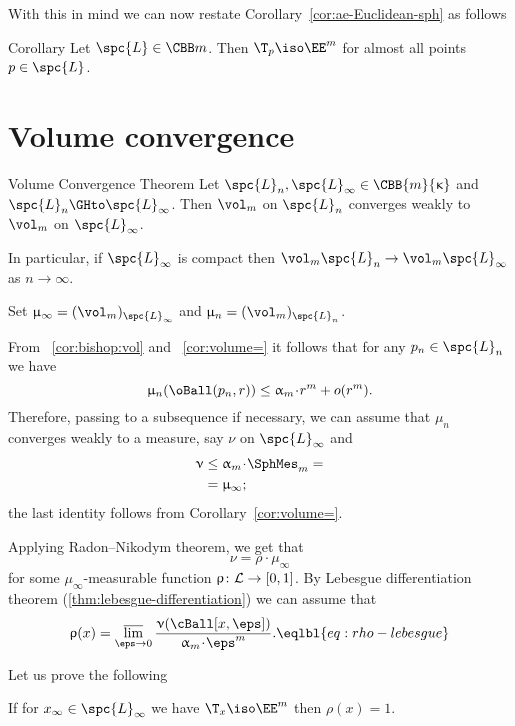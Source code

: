 With this in mind we can now restate Corollary~\ref{cor:ae-Euclidean-sph} as follows

\begin{thm}{Corollary}\label{cor:ae-Euclidean}
Let $\spc{L}\in\CBB m{}$.
Then $\T_p\iso\EE^m$ for almost all points $p\in \spc{L}$.
\end{thm}

\section{Volume convergence}


\begin{thm}{Volume Convergence Theorem}\label{thm:vol-coverge}
Let  $\spc{L}_n, \spc{L}_\infty\in \CBB{m}{\kappa}$ and $\spc{L}_n\GHto \spc{L}_\infty$.
Then $\vol_m$ on $\spc{L}_n$ converges weakly to $\vol_m$ on $\spc{L}_\infty$.

In particular,
if $\spc{L}_\infty$ is compact then 
$\vol_m\spc{L}_n\to \vol_m\spc{L}_\infty$
as $n\to\infty$.
\end{thm}

Set 
$\mu_\infty=(\vol_m)_{\spc{L}_\infty}$ 
and 
$\mu_n=(\vol_m)_{\spc{L}_n}$.

From ~\ref{cor:bishop:vol} and ~\ref{cor:volume=} it follows that for any $p_n\in\spc{L}_n$ we have
\[\mu_n(\oBall(p_n,r))\le \alpha_m\cdot r^m+o(r^m).\] 
Therefore, passing to a subsequence if necessary,
we can assume that $\mu_n$ converges weakly to a measure,
say $\nu$
on $\spc{L}_\infty$
and 
\begin{align*}
\nu&\le \alpha_m\cdot\SphMes_m= 
\\
&=\mu_\infty;
\end{align*}
the last identity follows from Corollary~\ref{cor:volume=}.


Applying Radon--Nikodym theorem, 
we get that 
\[\nu=\rho\cdot\mu_\infty\] 
for some $\mu_\infty$-measurable function $\rho\:\spc{L}\to[0,1]$.
By Lebesgue differentiation theorem (\ref{thm:lebesgue-differentiation})
we can assume that
\[\rho(x)
=
\limsup_{\eps\to0} \frac{\nu(\cBall[x,\eps])}{\alpha_m\cdot\eps^m}.
\eqlbl{eq:rho-lebesgue}\]

Let us prove the following

\begin{clm}{}\label{clm:euclid=>rho=1}
If for $x_\infty\in\spc{L}_\infty$
we have $\T_x\iso\EE^m$ 
then $\rho(x)=1$.
\end{clm}

